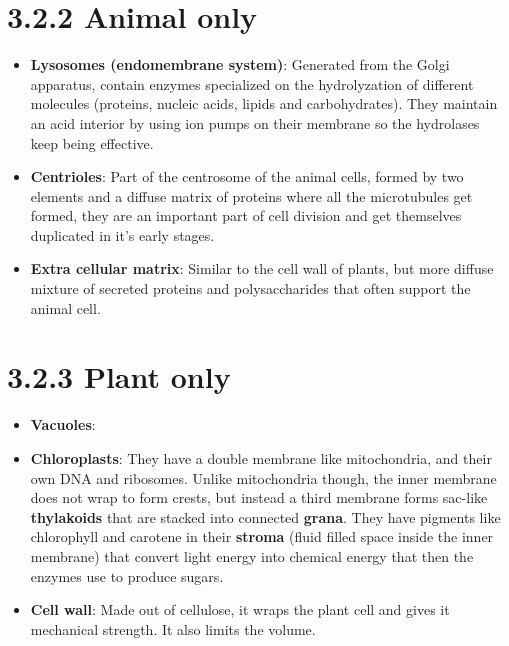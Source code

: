 \documentclass[a4paper,landscape,10pt]{cheatsheet}
\begin{document}
\section*{3.2.2 Animal only}
\begin{itemize}
      \item \textbf{Lysosomes (endomembrane system)}: Generated from the Golgi apparatus, contain enzymes specialized on the hydrolyzation of different
            molecules (proteins, nucleic acids, lipids and carbohydrates). They maintain an acid interior by using ion pumps on
            their membrane so the hydrolases keep being effective.
      \item \textbf{Centrioles}: Part of the centrosome of the animal cells, formed by two elements and a diffuse matrix
            of proteins where all the microtubules get formed, they are an important part of cell division and get
            themselves duplicated in it's early stages.
      \item \textbf{Extra cellular matrix}: Similar to the cell wall of plants, but more diffuse mixture of secreted
            proteins and polysaccharides that often support the animal cell.
\end{itemize}

\section*{3.2.3 Plant only}
\begin{itemize}
      \item \textbf{Vacuoles}:
      \item \textbf{Chloroplasts}: They have a double membrane like mitochondria, and their own DNA and ribosomes.
            Unlike mitochondria though, the inner membrane does not wrap to form crests, but instead a third membrane forms
            sac-like \textbf{thylakoids} that are stacked into connected \textbf{grana}. They have pigments like
            chlorophyll and carotene in their \textbf{stroma} (fluid filled space inside the inner membrane) that
            convert light energy into chemical energy that then the enzymes use to produce sugars.
      \item \textbf{Cell wall}: Made out of cellulose, it wraps the plant cell and gives it mechanical strength. It also
            limits the volume.
\end{itemize}
\end{document}
